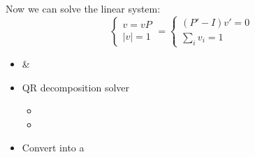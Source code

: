 \begin{frame}
  Now we can \alert{solve} the linear system:
  \begin{equation*}
    \begin{cases}
      v=vP\\
      |v| = 1
    \end{cases}
    =
    \begin{cases}
      (P'-I)v'=0\\
      \sum_i v_i = 1
    \end{cases}
  \end{equation*}
  \pause
  \begin{itemize}
  \item {} \& 
    \pause
  \item \alert{QR decomposition} solver
    \begin{itemize}\tiny
    \item {}
    \item {}
      \pause
    \end{itemize}
  \item \alert{Convert}  into a 
  \end{itemize}
\end{frame}

